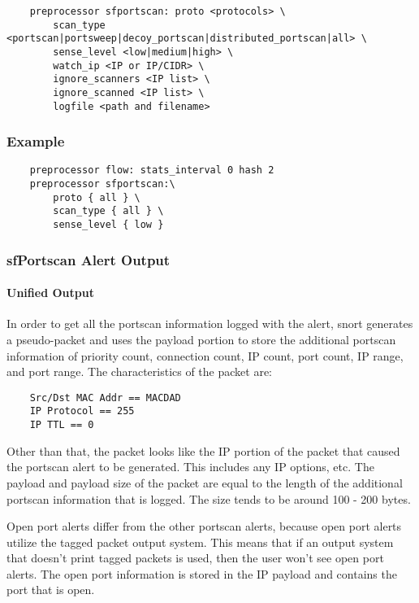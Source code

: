 \documentclass[english]{report}
\begin{document}
\begin{verbatim}
    preprocessor sfportscan: proto <protocols> \
        scan_type <portscan|portsweep|decoy_portscan|distributed_portscan|all> \
        sense_level <low|medium|high> \
        watch_ip <IP or IP/CIDR> \
        ignore_scanners <IP list> \
        ignore_scanned <IP list> \
        logfile <path and filename>
\end{verbatim}

\subsubsection{Example}

\begin{verbatim}
    preprocessor flow: stats_interval 0 hash 2
    preprocessor sfportscan:\
        proto { all } \
        scan_type { all } \
        sense_level { low }
\end{verbatim}

\subsubsection{sfPortscan Alert Output}

\paragraph{Unified Output}

In order to get all the portscan information logged with the alert, snort
generates a pseudo-packet and uses the payload portion to store the additional
portscan information of priority count, connection count, IP count, port count,
IP range, and port range.  The characteristics of the packet are:

\begin{verbatim}
    Src/Dst MAC Addr == MACDAD
    IP Protocol == 255
    IP TTL == 0
\end{verbatim}

Other than that, the packet looks like the IP portion of the packet that caused
the portscan alert to be generated.  This includes any IP options, etc.  The
payload and payload size of the packet are equal to the length of the
additional portscan information that is logged.  The size tends to be around
100 - 200 bytes.

Open port alerts differ from the other portscan alerts, because open port
alerts utilize the tagged packet output system.  This means that if an output
system that doesn't print tagged packets is used, then the user won't see open
port alerts.  The open port information is stored in the IP payload and
contains the port that is open.
\end{document}
